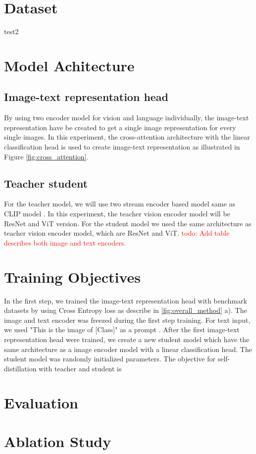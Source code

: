 \section{Dataset}
test2

\section{Model Achitecture}
\subsection{Image-text representation head}
By using two encoder model for vision and language individually, the image-text representation have be created to get a single image representation for every single images.
In this experiment, the cross-attention  architecture with the linear classification head is used to create image-text representation as illustrated in Figure \ref{fig:cross_attention}.

\subsection{Teacher student}
For the teacher model, we will use two stream encoder based model same as CLIP model .
In this experiment, the teacher vision encoder model will be ResNet  and ViT  version.
For the student model we used the same architecture as teacher vision encoder model, which are ResNet and ViT.
\textcolor{red}{todo: Add table describes both image and text encoders.}

\section{Training Objectives}
In the first step, we trained the image-text representation head with benchmark datasets by using Cross Entropy loss as describe in \ref{fig:overall_method} a). The image and text encoder was freezed during the first step training. For text input, we used "This is the image of [Class]" as a prompt . After the first image-text representation head were trained, we create a new student model which have the same architecture as a image encoder model with a linear classification head. The student model was randomly initialized parameters. The objective for self-distillation with teacher and student is


\section{Evaluation}
\section{Ablation Study}


